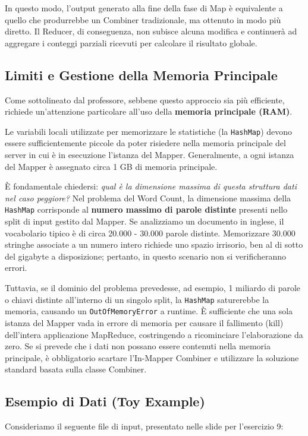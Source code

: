 In questo modo, l'output generato alla fine della fase di Map è equivalente a quello che produrrebbe un Combiner tradizionale, ma ottenuto in modo più diretto. Il Reducer, di conseguenza, non subisce alcuna modifica e continuerà ad aggregare i conteggi parziali ricevuti per calcolare il risultato globale.

\subsection{Limiti e Gestione della Memoria Principale}
Come sottolineato dal professore, sebbene questo approccio sia più efficiente, richiede un'attenzione particolare all'uso della \textbf{memoria principale (RAM)}. 

Le variabili locali utilizzate per memorizzare le statistiche (la \texttt{HashMap}) devono essere sufficientemente piccole da poter risiedere nella memoria principale del server in cui è in esecuzione l'istanza del Mapper. Generalmente, a ogni istanza del Mapper è assegnato circa 1 GB di memoria principale.

È fondamentale chiedersi: \textit{qual è la dimensione massima di questa struttura dati nel caso peggiore?}
Nel problema del Word Count, la dimensione massima della \texttt{HashMap} corrisponde al \textbf{numero massimo di parole distinte} presenti nello split di input gestito dal Mapper.
Se analizziamo un documento in inglese, il vocabolario tipico è di circa 20.000 - 30.000 parole distinte. Memorizzare 30.000 stringhe associate a un numero intero richiede uno spazio irrisorio, ben al di sotto del gigabyte a disposizione; pertanto, in questo scenario non si verificheranno errori.

Tuttavia, se il dominio del problema prevedesse, ad esempio, 1 miliardo di parole o chiavi distinte all'interno di un singolo split, la \texttt{HashMap} saturerebbe la memoria, causando un \texttt{OutOfMemoryError} a runtime. È sufficiente che una sola istanza del Mapper vada in errore di memoria per causare il fallimento (kill) dell'intera applicazione MapReduce, costringendo a ricominciare l'elaborazione da zero.
Se si prevede che i dati non possano essere contenuti nella memoria principale, è obbligatorio scartare l'In-Mapper Combiner e utilizzare la soluzione standard basata sulla classe Combiner.

\subsection{Esempio di Dati (Toy Example)}
Consideriamo il seguente file di input, presentato nelle slide per l'esercizio 9:

